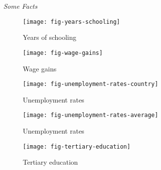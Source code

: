 \begin{frame}\begin{center}
		\LARGE\textit{Some Facts}
\end{center}\end{frame}
\begin{frame}
	\begin{figure}[htp]\centering
		\caption{Years of schooling}\scalebox{0.35}
		{\texttt{[image: fig-years-schooling]}}
	\end{figure}
\end{frame}
\begin{frame}
	\begin{figure}[htp]\centering
		\caption{Wage gains}\scalebox{0.35}
		{\texttt{[image: fig-wage-gains]}}
	\end{figure}
\end{frame}
\begin{frame}
	\begin{figure}[htp]\centering
		\caption{Unemployment rates}\scalebox{0.35}
		{\texttt{[image: fig-unemployment-rates-country]}}
	\end{figure}
\end{frame}
\begin{frame}
	\begin{figure}[htp]\centering
		\caption{Unemployment rates}\scalebox{0.35}
		{\texttt{[image: fig-unemployment-rates-average]}}
	\end{figure}
\end{frame}
\begin{frame}
	\begin{figure}[htp]\centering
		\caption{Tertiary education}\scalebox{0.35}
		{\texttt{[image: fig-tertiary-education]}}
	\end{figure}
\end{frame}

